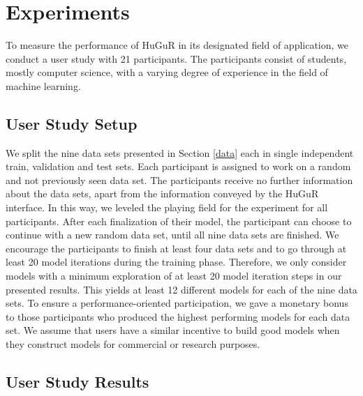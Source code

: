 \section{Experiments}
\label{experiments}

To measure the performance of HuGuR in its designated field of application, we conduct a user study with 21 participants. The participants consist of students, mostly computer science, with a varying degree of experience in the field of machine learning.

\subsection{User Study Setup}
We split the nine data sets presented in Section \ref{data} each in single independent train, validation and test sets. Each participant is assigned to work on a random and not previously seen data set. The participants receive no further information about the data sets, apart from the information conveyed by the HuGuR interface. In this way, we leveled
the playing field for the experiment for all participants.
After each finalization of their model, the participant can choose to continue with a new random data set, until all nine data sets are finished. We encourage the participants to finish at least four data sets and to go through at least 20 model iterations during the training phase. Therefore, we only consider models with a minimum exploration of at least 20 model iteration steps in our presented results. This yields at least 12 different models for each of the nine data sets. To ensure a performance-oriented participation, we gave a monetary bonus to those participants who produced the highest performing models for each data set. We assume that users have a similar incentive to build good models when they construct models for commercial or research purposes.

\subsection{User Study Results}

